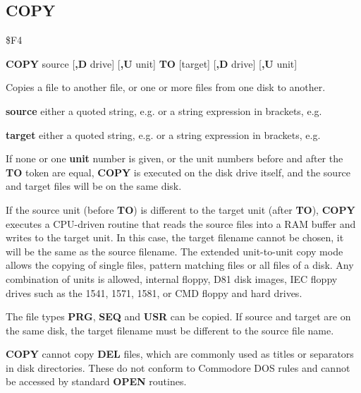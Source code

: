 \subsection{COPY}
\begin{description}[leftmargin=2cm,style=nextline]
\item [Token:]    \$F4

\item [Format:]   {\bf COPY} source [{\bf,D} drive] [{\bf,U} unit] {\bf TO} [target] [{\bf ,D} drive] [{\bf ,U} unit]

\item [Usage:]    Copies a file to another file, or one or more files from one disk to another.

                  {\bf source} either a quoted string, e.g.  or a string expression in brackets, e.g. 

                  {\bf target} either a quoted string, e.g.  or a string expression in brackets, e.g. 

                  \drivedefinition

                  \unitdefinition

                  If none or one {\bf unit} number is given, or the unit numbers before and after the {\bf TO} token are equal, {\bf COPY} is executed on the disk drive itself, and the source and target files will be on the same disk.

                  If the source unit (before {\bf TO}) is different to the target unit (after {\bf TO}), {\bf COPY} executes a CPU-driven routine that reads the source files into a RAM buffer and writes to the target unit. In this case, the target filename cannot be chosen, it will be the same as the source filename. The extended unit-to-unit copy mode allows the copying of single files, pattern matching files or all files of a disk. Any combination of units is allowed, internal floppy, D81 disk images, IEC floppy drives such as the 1541, 1571, 1581, or CMD floppy and hard drives.

\item [Remarks:]  The file types {\bf PRG}, {\bf SEQ} and {\bf USR} can be copied. If source and target are on the same disk, the target filename must be different to the source file name.

                  {\bf COPY} cannot copy {\bf DEL} files, which are commonly used as titles or separators in disk directories. These do not conform to Commodore DOS rules and cannot be accessed by standard {\bf OPEN} routines.


\end{description}

